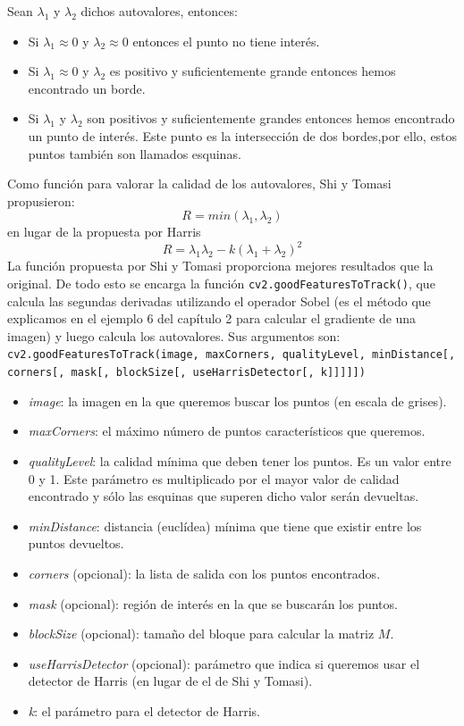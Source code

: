 \documentclass[a4paper,openright, 12pt]{book}
\begin{document}
Sean $\lambda_1$ y $\lambda_2$ dichos autovalores, entonces:
\begin{itemize}
\item Si  $ \lambda_1 \approx 0 $ y $\lambda_2 \approx 0 $ entonces el punto no tiene interés.
\item Si  $ \lambda_1 \approx 0 $ y $\lambda_2 $ es positivo y suficientemente grande entonces hemos encontrado un borde.
\item Si  $ \lambda_1 $ y $\lambda_2 $ son positivos y suficientemente grandes entonces hemos encontrado un punto de interés. Este punto es la intersección de dos bordes,por ello, estos puntos también son llamados esquinas.
\end{itemize}
Como función para valorar la calidad de los autovalores, Shi y Tomasi \cite{shiandtomasi} propusieron:
\begin{equation*}
R = min(\lambda_1, \lambda_2)
\end{equation*}
en lugar de la propuesta por Harris\cite{harris88}
\begin{equation*}
R = \lambda_1 \lambda_2 - k(\lambda_1 + \lambda_2)^2
\end{equation*}
La función propuesta por Shi y Tomasi proporciona mejores resultados que la original.
De todo esto se encarga la función \lstinline|cv2.goodFeaturesToTrack()|, que calcula las segundas derivadas utilizando el operador Sobel (es el método que explicamos en el ejemplo 6 del capítulo 2 para calcular el gradiente de una imagen) y luego calcula los autovalores.
Sus argumentos son:
\newline
\lstinline|cv2.goodFeaturesToTrack(image, maxCorners, qualityLevel, minDistance[, corners[, mask[, blockSize[, useHarrisDetector[, k]]]]]) |
\begin{itemize}
\item \textit{image}: la imagen en la que queremos buscar los puntos (en escala de grises).
\item \textit{maxCorners}:  el máximo número de puntos característicos que queremos.
\item \textit{qualityLevel}: la calidad mínima que deben tener los puntos. Es un valor entre 0 y 1. Este parámetro es multiplicado por el mayor valor de calidad encontrado y sólo las esquinas que superen dicho valor serán devueltas.
\item \textit{minDistance}: distancia (euclídea) mínima que tiene que existir entre los puntos devueltos.
\item \textit{corners} (opcional): la lista de salida con los puntos encontrados.
\item \textit{mask} (opcional): región de interés en la que se buscarán los puntos.
\item \textit{blockSize} (opcional): tamaño del bloque para calcular la matriz $M$.
\item \textit{useHarrisDetector} (opcional): parámetro que indica si queremos usar el detector de Harris (en lugar de el de Shi y Tomasi).
\item \textit{k}: el parámetro para el detector de Harris.
\end{itemize}
\end{document}
